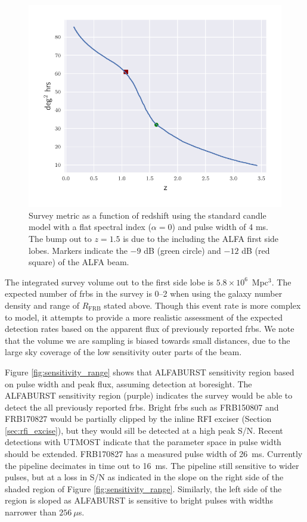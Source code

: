 \documentclass[a4paper,fleqn,usenatbib]{mnras}
\begin{document}
\begin{figure}
    \includegraphics[width=1.0\linewidth]{figures/full_sefd_z_relation.pdf}
    \caption{Survey metric as a function of redshift using the standard candle
    model with a flat spectral index ($\alpha=0$) and pulse width of 4 ms. The
    bump out to $z=1.5$ is due to the including the ALFA first side lobes.
    Markers indicate the $-9$ dB (green circle) and $-12$ dB (red square) of the
    ALFA beam.
    }
    \label{fig:full_sefd_z}
\end{figure}

The integrated survey volume out to the first side lobe is $5.8 \times
10^6$~Mpc$^3$. The expected number of \glspl{frb} in the survey is 0--2 when
using the galaxy number density and range of $R_{\textrm{FRB}}$ stated above.
Though this event rate is more complex to model, it attempts to provide a more
realistic assessment of the expected detection rates based on the apparent flux
of previously reported \glspl{frb}. We note that the volume we are sampling is
biased towards small distances, due to the large sky coverage of the low
sensitivity outer parts of the beam.

Figure \ref{fig:sensitivity_range} shows that ALFABURST sensitivity region based
on pulse width and peak flux, assuming detection at boresight. The ALFABURST
sensitivity region (purple) indicates the survey would be able to detect the all
previously reported \glspl{frb}. Bright \glspl{frb} such as FRB150807 and
FRB170827 would be partially clipped by the inline RFI exciser (Section
\ref{sec:rfi_excise}), but they would sill be detected at a high peak S/N.
Recent detections with UTMOST \citep{2017MNRAS.468.3746C,atel10697,atel10867}
indicate that the parameter space in pulse width should be extended.  FRB170827
has a measured pulse width of 26~ms. Currently the pipeline decimates in time
out to 16~ms. The pipeline still sensitive to wider pulses, but at a loss in S/N
as indicated in the slope on the right side of the shaded region of Figure
\ref{fig:sensitivity_range}.  Similarly, the left side of the region is sloped
as ALFABURST is sensitive to bright pulses with widths narrower than $256~\mu$s.
\end{document}
